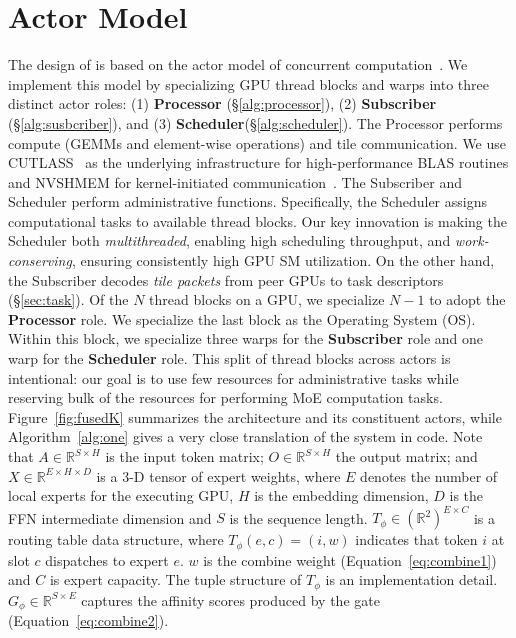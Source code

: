 \section{Actor Model}\label{sec:actor-model}
The design of \sysname is based on the actor model of concurrent
computation~\cite{agha:85, 10.5555/1624775.1624804, Greif:75}.
We implement this model by specializing GPU thread blocks and warps into three distinct actor roles:
(1) \textbf{Processor} (\S\ref{alg:processor}), (2) \textbf{Subscriber} (\S\ref{alg:susbcriber}),
and (3) \textbf{Scheduler}(\S\ref{alg:scheduler}).
The Processor performs compute (GEMMs and element-wise operations) and tile communication.
We use CUTLASS~\cite{Thakkar_CUTLASS_2023} as the underlying infrastructure for high-performance
BLAS routines and NVSHMEM for kernel-initiated communication~\cite{nvshm}.
The Subscriber and Scheduler perform administrative functions.
Specifically, the Scheduler assigns computational tasks to available thread blocks.
Our key innovation is making the Scheduler both \emph{multithreaded},
enabling high scheduling throughput, and \emph{work-conserving}, ensuring consistently high GPU SM utilization.
On the other hand, the Subscriber decodes \emph{tile packets} from peer GPUs to task descriptors
(\S\ref{sec:task}).
Of the $N$ thread blocks on a GPU, we specialize $N-1$ to adopt the \textbf{Processor} role.
We specialize the last block as the Operating System (OS).
Within this block, we specialize three warps for the \textbf{Subscriber} role and
one warp for the \textbf{Scheduler} role.
This split of thread blocks across actors is intentional: our goal is to use few resources for administrative
tasks while reserving bulk of the resources for performing MoE computation tasks.
Figure~\ref{fig:fusedK} summarizes the
\sysname architecture and its constituent actors, while Algorithm~\ref{alg:one} gives a very close translation of the
system in code.
Note that $A \in \mathbb{R}^{S \times H}$ is the input token matrix;
$O \in \mathbb{R}^{S \times H}$ the output matrix;
and $X \in \mathbb{R}^{E\times H \times D}$ is a 3-D tensor of expert weights,
where $E$ denotes the number of local experts for the executing GPU, $H$ is the embedding dimension,
$D$ is the FFN intermediate dimension and $S$ is the sequence length.
$T_{\phi} \in \left(\mathbb{R}^2\right)^{E \times C}$
is a routing table data structure, where $T_{\phi}\left( e, c\right) = (i, w)$ indicates that token $i$ at slot $c$
dispatches to expert $e$. $w$ is the combine weight (Equation~\ref{eq:combine1}) and $C$ is expert capacity.
The tuple structure of $T_{\phi}$ is an implementation detail. $G_{\phi} \in \mathbb{R}^{S \times E}$ captures
the affinity scores produced by the gate (Equation~\ref{eq:combine2}).
